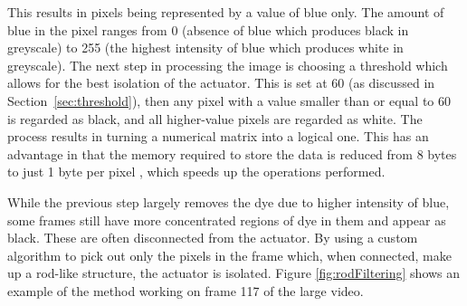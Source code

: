 This results in pixels being represented by a value of blue only. The amount of blue in the pixel ranges from 0 (absence of blue which produces black in greyscale) to 255 (the highest intensity of blue which produces white in greyscale). The next step in processing the image is choosing a threshold which allows for the best isolation of the actuator. This is set at 60 (as discussed in Section~\ref{sec:threshold}), then any pixel with a value smaller than or equal to 60 is regarded as black, and all higher-value pixels are regarded as white. The process results in turning a numerical matrix into a logical one. This has an advantage in that the memory required to store the data is reduced from 8 bytes to just 1 byte per pixel \cite{matlab}, which speeds up the operations performed.


While the previous step largely removes the dye due to higher intensity of blue, some frames still have more concentrated regions of dye in them and appear as black. These are often disconnected from the actuator. By using a custom algorithm to pick out only the pixels in the frame which, when connected, make up a rod-like structure, the actuator is isolated. Figure \ref{fig:rodFiltering} shows an example of the method working on frame 117 of the large video.

